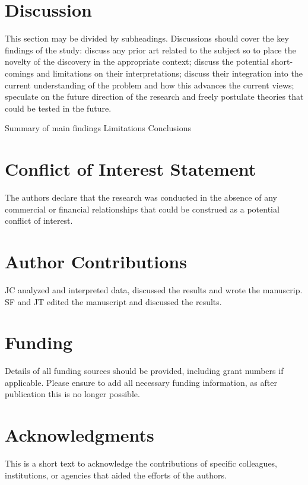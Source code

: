 \documentclass{frontiersSCNS}
\begin{document}
\section{Discussion}\label{discussion}

This section may be divided by subheadings. Discussions should cover the
key findings of the study: discuss any prior art related to the subject
so to place the novelty of the discovery in the appropriate context;
discuss the potential short-comings and limitations on their
interpretations; discuss their integration into the current
understanding of the problem and how this advances the current views;
speculate on the future direction of the research and freely postulate
theories that could be tested in the future.

Summary of main findings Limitations Conclusions

\section*{Conflict of Interest Statement}

The authors declare that the research was conducted in the absence of
any commercial or financial relationships that could be construed as a
potential conflict of interest.

\section*{Author Contributions}

JC analyzed and interpreted data, discussed the results and wrote the
manuscrip. SF and JT edited the manuscript and discussed the results.

\section*{Funding}

Details of all funding sources should be provided, including grant
numbers if applicable. Please ensure to add all necessary funding
information, as after publication this is no longer possible.

\section*{Acknowledgments}

This is a short text to acknowledge the contributions of specific
colleagues, institutions, or agencies that aided the efforts of the
authors.
\end{document}
